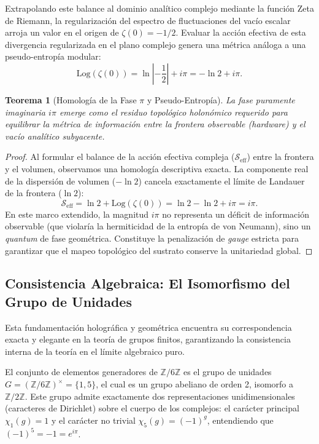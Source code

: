 \documentclass[12pt,a4paper]{article}
\theoremstyle{plain}
\newtheorem{teorema}{Teorema}[section]
\theoremstyle{definition}
\theoremstyle{remark}
\begin{document}
Extrapolando este balance al dominio analítico complejo mediante la función Zeta de Riemann, la regularización del espectro de fluctuaciones del vacío escalar arroja un valor en el origen de $\zeta(0) = -1/2$. Evaluar la acción efectiva de esta divergencia regularizada en el plano complejo genera una métrica análoga a una pseudo-entropía modular:
\begin{equation}
    \text{Log}(\zeta(0)) = \ln\left|-\frac{1}{2}\right| + i\pi = -\ln 2 + i\pi.
\end{equation}

\begin{teorema}[Homología de la Fase $\pi$ y Pseudo-Entropía]
La fase puramente imaginaria $i\pi$ emerge como el residuo topológico holonómico requerido para equilibrar la métrica de información entre la frontera observable (hardware) y el vacío analítico subyacente.
\end{teorema}
\begin{proof}
Al formular el balance de la acción efectiva compleja ($\mathcal{S}_{\text{eff}}$) entre la frontera y el volumen, observamos una homología descriptiva exacta. La componente real de la dispersión de volumen ($-\ln 2$) cancela exactamente el límite de Landauer de la frontera ($\ln 2$):
\begin{equation}
    \mathcal{S}_{\text{eff}} = \ln 2 + \text{Log}(\zeta(0)) = \ln 2 - \ln 2 + i\pi = i\pi.
\end{equation}
En este marco extendido, la magnitud $i\pi$ no representa un déficit de información observable (que violaría la hermiticidad de la entropía de von Neumann), sino un \textit{quantum} de fase geométrica. Constituye la penalización de \textit{gauge} estricta para garantizar que el mapeo topológico del sustrato conserve la unitariedad global.
\end{proof}

\subsection{Consistencia Algebraica: El Isomorfismo del Grupo de Unidades}
\label{subsec:isomorfismo_unidades}

Esta fundamentación holográfica y geométrica encuentra su correspondencia exacta y elegante en la teoría de grupos finitos, garantizando la consistencia interna de la teoría en el límite algebraico puro.

El conjunto de elementos generadores de $\mathbb{Z}/6\mathbb{Z}$ es el grupo de unidades $G = (\mathbb{Z}/6\mathbb{Z})^{\times} = \{1,5\}$, el cual es un grupo abeliano de orden 2, isomorfo a $\mathbb{Z}/2\mathbb{Z}$. Este grupo admite exactamente dos representaciones unidimensionales (caracteres de Dirichlet) sobre el cuerpo de los complejos: el carácter principal $\chi_1(g) = 1$ y el carácter no trivial $\chi_5(g) = (-1)^g$, entendiendo que $(-1)^5 = -1 = e^{i\pi}$.
\end{document}
